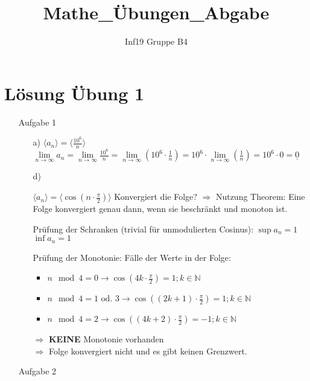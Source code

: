 \documentclass{scrreprt}
\title{Mathe\_Übungen\_Abgabe} %
\author{Inf19 Gruppe B4}
\begin{document}
    \maketitle

    \newpage
    \setcounter{page}{1}

    \section*{Lösung Übung 1}
    \begin{enumerate}
        \item[Aufgabe 1]
        \begin{enumerate}
            \item[a)]{
                $\langle a_n \rangle = \langle \frac{10^6}{n}\rangle$\newline
                $\lim \limits_{n \to \infty} a_n = \lim \limits_{n \to \infty} \frac{10^6}{n} = \lim \limits_{n \to \infty} (10^6 \cdot \frac{1}{n} ) = 10^6 \cdot \lim \limits_{n \to \infty} (\frac{1}{n}) = 10^6 \cdot 0 = \underline{0}$
            }
            \item[d)]{
                $\langle a_n \rangle = \langle\cos(n\cdot\frac{\pi}{2})\rangle$\newline
                Konvergiert die Folge?\newline
                $\Rightarrow$ Nutzung Theorem: Eine Folge konvergiert genau dann, wenn sie beschränkt und monoton ist.\newline

                Prüfung der Schranken (trivial für unmodulierten Cosinus):\newline
                \textbullet $\sup a_n = 1$\newline
                \textbullet $\inf a_n = 1$\newline

                Prüfung der Monotonie:\newline
                Fälle der Werte in der Folge:
                \begin{itemize}
                    \item{$n\mod 4 = 0 \rightarrow \cos(4k\cdot \frac{\pi}{2}) = 1 ; k\in \mathbb{N} $}
                    \item{$n\mod 4 = 1 \text{ od. } 3 \rightarrow \cos((2k + 1)\cdot \frac{\pi}{2}) = 1 ; k\in \mathbb{N} $}
                    \item{$n\mod 4 = 2 \rightarrow \cos((4k + 2)\cdot \frac{\pi}{2}) = -1 ; k\in \mathbb{N} $}
                \end{itemize}
                $\Rightarrow$ \textbf{KEINE} Monotonie vorhanden\\
                $\Rightarrow$ Folge konvergiert nicht und es gibt keinen Grenzwert.
            }
        \end{enumerate}
        \item[Aufgabe 2]
    \end{enumerate}
\end{document}

